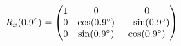 \documentclass[preview]{standalone}
\begin{document}
\begin{align*}
\special{dvisvgm:raw <g id='unique000'>}R_x(0.9^\circ) = \begin{pmatrix} 1 & 0 & 0 \\ 0 & \cos(0.9^\circ) & -\sin(0.9^\circ) \\ 0 & \sin(0.9^\circ) & \cos(0.9^\circ) \end{pmatrix}\special{dvisvgm:raw </g>}
\end{align*}
\end{document}
